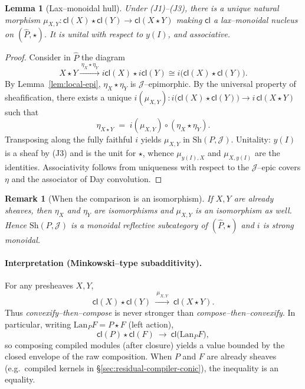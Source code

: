 \documentclass[11pt]{article}
\numberwithin{equation}{section}
\theoremstyle{upright}
\newtheorem{lemma}{Lemma}
\newtheorem{remark}{Remark}
\newcommand{\Lan}{\mathrm{Lan}}
\newcommand{\Sh}{\mathrm{Sh}}
\begin{document}
\begin{lemma}[Lax--monoidal hull]\label{lem:lax-monoidal-hull}
Under \emph{(J1)--(J3)}, there is a unique natural morphism
$\mu_{X,Y}:\mathsf{cl}(X)\star \mathsf{cl}(Y)\to \mathsf{cl}(X\star Y)$
making $\mathsf{cl}$ a \emph{lax--monoidal nucleus} on $(\widehat P,\star)$.
It is unital with respect to $y(I)$, and associative.
\end{lemma}

\begin{proof}
Consider in $\widehat P$ the diagram
\[
X\star Y \xrightarrow{\ \eta_X\star\eta_Y\ } i\mathsf{cl}(X)\star i\mathsf{cl}(Y)
\cong i\bigl(\mathsf{cl}(X)\star \mathsf{cl}(Y)\bigr).
\]
By Lemma~\ref{lem:local-epi}, $\eta_X\star\eta_Y$ is $\mathcal J$--epimorphic.
By the universal property of sheafification, there exists a unique
$i(\mu_{X,Y}):i\bigl(\mathsf{cl}(X)\star\mathsf{cl}(Y)\bigr)\to i\,\mathsf{cl}(X\star Y)$
such that
\[
\eta_{X\star Y} \;=\; i(\mu_{X,Y})\circ(\eta_X\star\eta_Y).
\]
Transposing along the fully faithful $i$ yields $\mu_{X,Y}$ in $\Sh(P,\mathcal J)$.
Unitality: $y(I)$ is a sheaf by (J3) and is the unit for $\star$, whence
$\mu_{y(I),X}$ and $\mu_{X,y(I)}$ are the identities. Associativity follows from
uniqueness with respect to the $\mathcal J$--epic covers $\eta$ and the associator
of Day convolution.
\end{proof}

\begin{remark}[When the comparison is an isomorphism]
If $X,Y$ are already sheaves, then $\eta_X$ and $\eta_Y$ are isomorphisms and
$\mu_{X,Y}$ is an isomorphism as well. Hence $\Sh(P,\mathcal J)$ is a monoidal
reflective subcategory of $(\widehat P,\star)$ and $i$ is strong monoidal.
\end{remark}

\paragraph{Interpretation (Minkowski--type subadditivity).}
For any presheaves $X,Y$,
\[
\mathsf{cl}(X)\star \mathsf{cl}(Y)\ \xrightarrow{\ \mu_{X,Y}\ }\ \mathsf{cl}(X\star Y).
\]
Thus \emph{convexify--then--compose} is never stronger than \emph{compose--then--convexify}.
In particular, writing $\Lan_P F = P\star F$ (left action),
\[
\mathsf{cl}(P)\star \mathsf{cl}(F)\ \longrightarrow\ \mathsf{cl}\bigl(\Lan_P F\bigr),
\]
so composing compiled modules (after closure) yields a value bounded by the closed
envelope of the raw composition. When $P$ and $F$ are already sheaves (e.g.\ compiled
kernels in \S\ref{sec:residual-compiler-conic}), the inequality is an equality.
\end{document}
